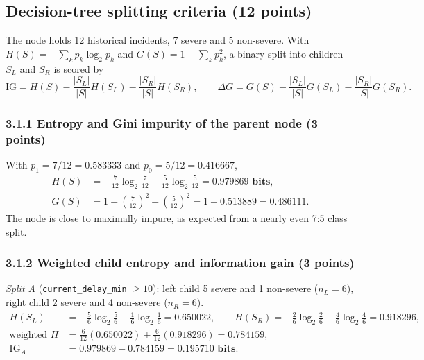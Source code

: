\documentclass[11pt,a4paper]{article}
\newcommand{\code}[1]{\texttt{#1}}
\begin{document}
\subsection{Decision-tree splitting criteria (12 points)}

The node holds 12 historical incidents, 7 severe and 5 non-severe. With
$H(S) = -\sum_k p_k\log_2 p_k$ and $G(S) = 1 - \sum_k p_k^2$, a binary split into children
$S_L$ and $S_R$ is scored by
\begin{equation}
\mathrm{IG} = H(S) - \frac{|S_L|}{|S|}H(S_L) - \frac{|S_R|}{|S|}H(S_R),
\qquad
\Delta G = G(S) - \frac{|S_L|}{|S|}G(S_L) - \frac{|S_R|}{|S|}G(S_R).
\label{eq:split}
\end{equation}

\subsubsection*{3.1.1 Entropy and Gini impurity of the parent node (3 points)}

With $p_1 = 7/12 = 0.583333$ and $p_0 = 5/12 = 0.416667$,
\begin{align*}
H(S) &= -\tfrac{7}{12}\log_2\tfrac{7}{12} - \tfrac{5}{12}\log_2\tfrac{5}{12}
      = \mathbf{0.979869 \text{ bits}}, \\
G(S) &= 1 - \left(\tfrac{7}{12}\right)^2 - \left(\tfrac{5}{12}\right)^2
      = 1 - 0.513889 = \mathbf{0.486111}.
\end{align*}
The node is close to maximally impure, as expected from a nearly even 7:5 class split.

\subsubsection*{3.1.2 Weighted child entropy and information gain (3 points)}

\emph{Split A} (\code{current\_delay\_min} $\ge 10$): left child 5 severe and 1 non-severe
($n_L = 6$), right child 2 severe and 4 non-severe ($n_R = 6$).
\begin{align*}
H(S_L) &= -\tfrac56\log_2\tfrac56 - \tfrac16\log_2\tfrac16 = 0.650022, \qquad
H(S_R)  = -\tfrac26\log_2\tfrac26 - \tfrac46\log_2\tfrac46 = 0.918296, \\
\text{weighted } H &= \tfrac{6}{12}(0.650022) + \tfrac{6}{12}(0.918296) = 0.784159, \\
\mathrm{IG}_A &= 0.979869 - 0.784159 = \mathbf{0.195710 \text{ bits}}.
\end{align*}
\end{document}
